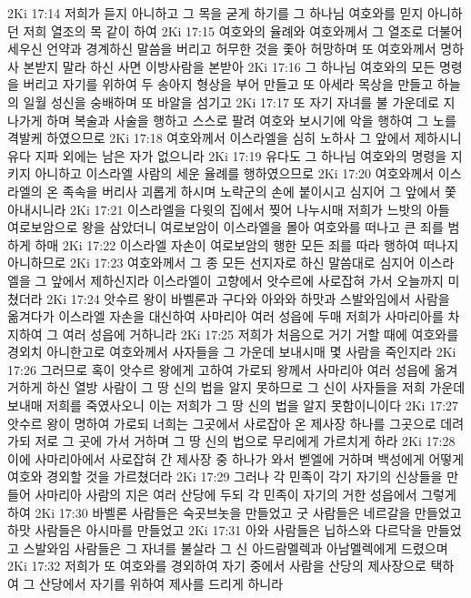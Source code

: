 2Ki 17:14  저희가 듣지 아니하고 그 목을 굳게 하기를 그 하나님 여호와를 믿지 아니하던 저희 열조의 목 같이 하여
2Ki 17:15  여호와의 율례와 여호와께서 그 열조로 더불어 세우신 언약과 경계하신 말씀을 버리고 허무한 것을 좇아 허망하며 또 여호와께서 명하사 본받지 말라 하신 사면 이방사람을 본받아
2Ki 17:16  그 하나님 여호와의 모든 명령을 버리고 자기를 위하여 두 송아지 형상을 부어 만들고 또 아세라 목상을 만들고 하늘의 일월 성신을 숭배하며 또 바알을 섬기고
2Ki 17:17  또 자기 자녀를 불 가운데로 지나가게 하며 복술과 사술을 행하고 스스로 팔려 여호와 보시기에 악을 행하여 그 노를 격발케 하였으므로
2Ki 17:18  여호와께서 이스라엘을 심히 노하사 그 앞에서 제하시니 유다 지파 외에는 남은 자가 없으니라
2Ki 17:19  유다도 그 하나님 여호와의 명령을 지키지 아니하고 이스라엘 사람의 세운 율례를 행하였으므로
2Ki 17:20  여호와께서 이스라엘의 온 족속을 버리사 괴롭게 하시며 노략군의 손에 붙이시고 심지어 그 앞에서 쫓아내시니라
2Ki 17:21  이스라엘을 다윗의 집에서 찢어 나누시매 저희가 느밧의 아들 여로보암으로 왕을 삼았더니 여로보암이 이스라엘을 몰아 여호와를 떠나고 큰 죄를 범하게 하매
2Ki 17:22  이스라엘 자손이 여로보암의 행한 모든 죄를 따라 행하여 떠나지 아니하므로
2Ki 17:23  여호와께서 그 종 모든 선지자로 하신 말씀대로 심지어 이스라엘을 그 앞에서 제하신지라 이스라엘이 고향에서 앗수르에 사로잡혀 가서 오늘까지 미쳤더라
2Ki 17:24  앗수르 왕이 바벨론과 구다와 아와와 하맛과 스발와임에서 사람을 옮겨다가 이스라엘 자손을 대신하여 사마리아 여러 성읍에 두매 저희가 사마리아를 차지하여 그 여러 성읍에 거하니라
2Ki 17:25  저희가 처음으로 거기 거할 때에 여호와를 경외치 아니한고로 여호와께서 사자들을 그 가운데 보내시매 몇 사람을 죽인지라
2Ki 17:26  그러므로 혹이 앗수르 왕에게 고하여 가로되 왕께서 사마리아 여러 성읍에 옮겨 거하게 하신 열방 사람이 그 땅 신의 법을 알지 못하므로 그 신이 사자들을 저희 가운데 보내매 저희를 죽였사오니 이는 저희가 그 땅 신의 법을 알지 못함이니이다
2Ki 17:27  앗수르 왕이 명하여 가로되 너희는 그곳에서 사로잡아 온 제사장 하나를 그곳으로 데려가되 저로 그 곳에 가서 거하며 그 땅 신의 법으로 무리에게 가르치게 하라
2Ki 17:28  이에 사마리아에서 사로잡혀 간 제사장 중 하나가 와서 벧엘에 거하며 백성에게 어떻게 여호와 경외할 것을 가르쳤더라
2Ki 17:29  그러나 각 민족이 각기 자기의 신상들을 만들어 사마리아 사람의 지은 여러 산당에 두되 각 민족이 자기의 거한 성읍에서 그렇게 하여
2Ki 17:30  바벨론 사람들은 숙곳브놋을 만들었고 굿 사람들은 네르갈을 만들었고 하맛 사람들은 아시마를 만들었고
2Ki 17:31  아와 사람들은 닙하스와 다르닥을 만들었고 스발와임 사람들은 그 자녀를 불살라 그 신 아드람멜렉과 아남멜렉에게 드렸으며
2Ki 17:32  저희가 또 여호와를 경외하여 자기 중에서 사람을 산당의 제사장으로 택하여 그 산당에서 자기를 위하여 제사를 드리게 하니라
